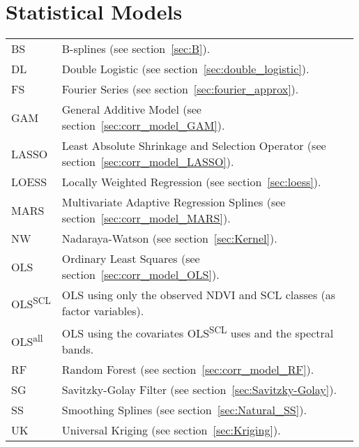 \section*{Statistical Models}\vspace{-0.2cm}
\begin{longtable}{p{0.12\linewidth} p{0.87\linewidth}}
	BS & B-splines (see section~\ref{sec:B}).\\
	DL & Double Logistic (see section~\ref{sec:double_logistic}).\\
	FS & Fourier Series (see section~\ref{sec:fourier_approx}).\\
	GAM & General Additive Model (see section~\ref{sec:corr_model_GAM}).\\
	LASSO & Least Absolute Shrinkage and Selection Operator (see section~\ref{sec:corr_model_LASSO}).\\
	LOESS & Locally Weighted Regression (see section~\ref{sec:loess}).\\
	MARS & Multivariate Adaptive Regression Splines (see section~\ref{sec:corr_model_MARS}).\\
	NW & Nadaraya-Watson (see section~\ref{sec:Kernel}).\\
	OLS & Ordinary Least Squares (see section~\ref{sec:corr_model_OLS}).\\
	OLS\textsuperscript{SCL} & OLS using only the observed NDVI and SCL classes (as factor variables).\\
	OLS\textsuperscript{all} & OLS using the covariates OLS\textsuperscript{SCL} uses and the spectral bands.\\
	RF & Random Forest (see section~\ref{sec:corr_model_RF}).\\
	SG & Savitzky-Golay Filter (see section~\ref{sec:Savitzky-Golay}).\\
	SS & Smoothing Splines (see section~\ref{sec:Natural_SS}).\\
	UK & Universal Kriging (see section~\ref{sec:Kriging}).\\
\end{longtable} \renewcommand{\arraystretch}{1}












